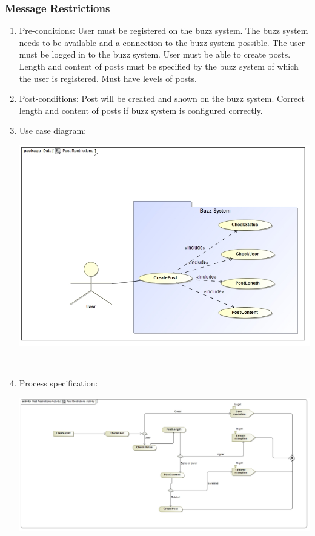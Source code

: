 \documentclass[hidelinks, 12pt, oneside]{article}
\begin{document}
\subsubsection{Message Restrictions}
\begin{enumerate}
 \item Pre-conditions:  User must be registered on the buzz system. The buzz system needs to be available and a connection to the buzz system possible. The user must be logged in to the buzz system. User must be able to create posts. Length and content of posts must be specified by the buzz system of which the user is registered. Must have levels of posts.
 
 \item Post-conditions: Post will be created and shown on the buzz system. Correct length and content of posts if buzz system is configured correctly.

 \item Use case diagram:\\
  \centerline{\includegraphics[scale=0.4]{PostRestrictions}}\\
  \item Process specification:\\ 
 \centerline{\includegraphics[scale=0.35]{PostRestrictionsActivity}} 
\end{enumerate}
\end{document}
